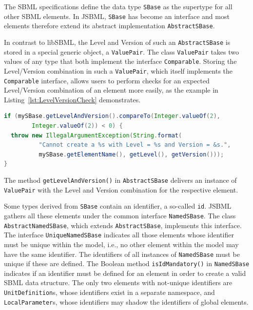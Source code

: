 The SBML specifications define the data type
\texttt{SBase} as the
supertype for all other SBML elements. In JSBML, \texttt{SBase} has become an
interface and most elements therefore extend its abstract implementation
\texttt{AbstractSBase}.

In contrast to libSBML, the Level and Version of such an \texttt{AbstractSBase}
is stored in a special generic object, a \texttt{ValuePair}.
%
The class \texttt{ValuePair} takes two values of any type that both implement
the interface \texttt{Comparable}.
%
Storing the Level/Version combination in such a \texttt{ValuePair}, which itself
implements the \texttt{Comparable} interface, allows users to perform checks for
an expected Level/Version combination of an element more easily, as the example
in Listing~\vref{lst:LevelVersionCheck} demonstrates.
\begin{lstlisting}[language=Java,float=h,caption={Check for a minimal expected Level/Version combination},label={lst:LevelVersionCheck}]
if (mySBase.getLevelAndVersion().compareTo(Integer.valueOf(2),
        Integer.valueOf(2)) < 0) {
  throw new IllegalArgumentException(String.format(
          "Cannot create a %s with Level = %s and Version = &s.",
          mySBase.getElementName(), getLevel(), getVersion()));
}
\end{lstlisting}
The method \texttt{getLevelAndVersion()} in \texttt{AbstractSBase}
%
delivers an instance of \texttt{ValuePair}
%
with the Level and Version combination for the respective element.

Some types derived from \texttt{SBase} contain an identifier, a so-called
\texttt{id}. JSBML gathers all these elements under the common interface
\texttt{NamedSBase}. The class \texttt{AbstractNamedSBase}, which extends
\texttt{AbstractSBase}, implements this interface.
%
%
The interface \texttt{UniqueNamedSBase} indicates all those elements whose
identifier must be unique within the model, i.e., no other element within the
model may have the same identifier. The identifiers of all instances of
\texttt{NamedSBase} must be unique if these are defined. The Boolean method
\texttt{isIdMandatory()} in \texttt{NamedSBase} indicates if an identifier must
be defined for an element in order to create a valid SBML data structure. The
only two elements with not-unique identifiers are
\texttt{UnitDefinition}s,
whose identifiers exist in a separate namespace, and
\texttt{LocalParameter}s,
whose identifiers may shadow the identifiers of global elements.


